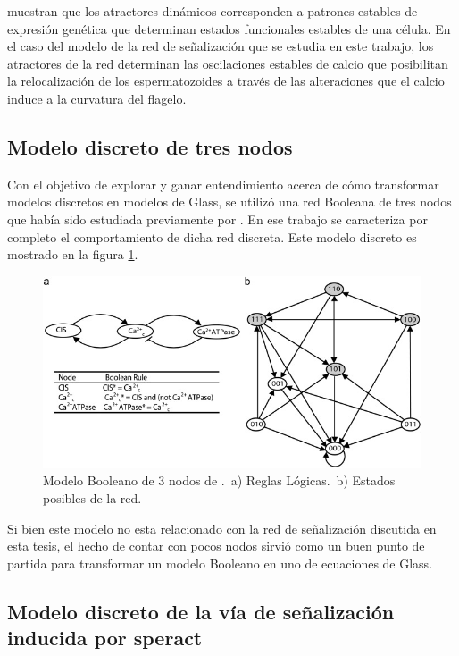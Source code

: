 \citeauthor{huang2005} \citep{huang2005} muestran que los atractores din\'amicos corresponden a patrones estables de expresi\'on gen\'etica que determinan estados funcionales estables de una c\'elula. En el caso del modelo de la red de se\~nalizaci\'on que se estudia en este trabajo, los atractores de la red determinan las oscilaciones estables de calcio que posibilitan la relocalizaci\'on de los espermatozoides a trav\'es de las alteraciones que el calcio induce a la curvatura del flagelo.

\subsection{Modelo discreto de tres nodos}\label{sect:3nodos}


Con el objetivo de explorar y ganar entendimiento acerca de cómo transformar modelos discretos en modelos de Glass, se utilizó una red Booleana de tres nodos que había sido estudiada previamente por \citeauthor{Reka3Nodos2010}. En ese trabajo se caracteriza por completo el comportamiento de dicha red discreta. Este modelo discreto es mostrado en la figura \ref{fig:red3reka}.

\begin{figure}[hbt]
\includegraphics[width=0.9\linewidth]{gfx/red3nodos}
\caption[Modelo Booleano de 3 nodos]{Modelo Booleano de 3 nodos de \citeauthor{Reka3Nodos2010} \citep{Reka3Nodos2010}.\ a) Reglas L\'ogicas.\ b) Estados posibles de la red.}\label{fig:red3reka}
\end{figure}


Si bien este modelo no esta relacionado con la red de señalización discutida en esta tesis, el hecho de contar con pocos nodos sirvió como un buen punto de partida para transformar un modelo Booleano en uno de ecuaciones de Glass.

\subsection{Modelo discreto de la vía de señalización inducida por speract}\label{sect:erizo}


